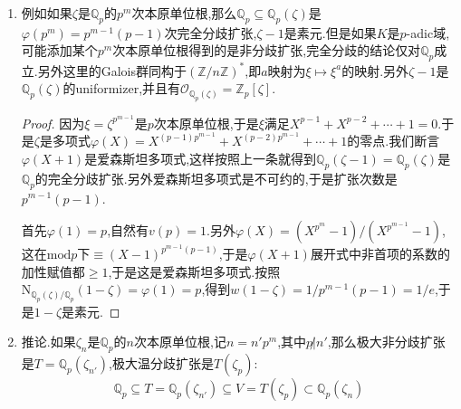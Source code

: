 \begin{enumerate}
\begin{proof}
    	\qquad
    	
    	我们断言$f(X)$是爱森斯坦多项式.按照$f(\Pi)=0$,单项式中赋值最小的项至少有两项,但是$a_i\Pi^{n-i}$的赋值都不同,所以仅有的赋值最小且相同的两项是$w(\Pi^n)=w(a_n)$.按照扩张是完全分歧的,有$e=n$,于是有$1=ew(\Pi)=w(\Pi^n)=w(a_n)=v(a_n)$,并且$w(\Pi^n)=w(a_n)$赋值最小说明$w(a_i\Pi^{n-i})=nv(a_i)+(n-i)/n\ge 1,i\ge1$.进而有$v(a_i)\ge1$,于是$f(X)$是爱森斯坦多项式.
    \end{proof}
    \item 例如如果$\zeta$是$\mathbb{Q}_p$的$p^m$次本原单位根,那么$\mathbb{Q}_p\subseteq\mathbb{Q}_p(\zeta)$是$\varphi(p^m)=p^{m-1}(p-1)$次完全分歧扩张,$\zeta-1$是素元.但是如果$K$是$p$-adic域,可能添加某个$p^m$次本原单位根得到的是非分歧扩张,完全分歧的结论仅对$\mathbb{Q}_p$成立.另外这里的Galois群同构于$(\mathbb{Z}/n\mathbb{Z})^*$,即$a$映射为$\xi\mapsto\xi^a$的映射.另外$\zeta-1$是$\mathbb{Q}_p(\zeta)$的uniformizer,并且有$\mathscr{O}_{\mathbb{Q}_p(\zeta)}=\mathbb{Z}_p[\zeta]$.
    \begin{proof}
    	
    	因为$\xi=\zeta^{p^{m-1}}$是$p$次本原单位根,于是$\xi$满足$X^{p-1}+X^{p-2}+\cdots+1=0$.于是$\zeta$是多项式$\varphi(X)=X^{(p-1)p^{m-1}}+X^{(p-2)p^{m-1}}+\cdots+1$的零点.我们断言$\varphi(X+1)$是爱森斯坦多项式,这样按照上一条就得到$\mathbb{Q}_p(\zeta-1)=\mathbb{Q}_p(\zeta)$是$\mathbb{Q}_p$的完全分歧扩张.另外爱森斯坦多项式是不可约的,于是扩张次数是$p^{m-1}(p-1)$.
    	
    	\qquad
    	
    	首先$\varphi(1)=p$,自然有$v(p)=1$.另外$\varphi(X)=(X^{p^m}-1)/(X^{p^{m-1}}-1)$,这在$\mathrm{mod}p$下$\equiv(X-1)^{p^{m-1}(p-1)}$,于是$\varphi(X+1)$展开式中非首项的系数的加性赋值都$\ge1$,于是这是爱森斯坦多项式.按照$\mathrm{N}_{\mathbb{Q}_p(\zeta)/\mathbb{Q}_p}(1-\zeta)=\varphi(1)=p$,得到$w(1-\zeta)=1/p^{m-1}(p-1)=1/e$,于是$1-\zeta$是素元.
    \end{proof}
    \item 推论.如果$\zeta_n$是$\mathbb{Q}_p$的$n$次本原单位根,记$n=n'p^m$,其中$p\not| n'$,那么极大非分歧扩张是$T=\mathbb{Q}_p(\zeta_{n'})$,极大温分歧扩张是$T(\zeta_p)$:
    $$\mathbb{Q}_p\subseteq T=\mathbb{Q}_p(\zeta_{n'})\subseteq V=T(\zeta_p)\subset\mathbb{Q}_p(\zeta_n)$$
\end{enumerate}

